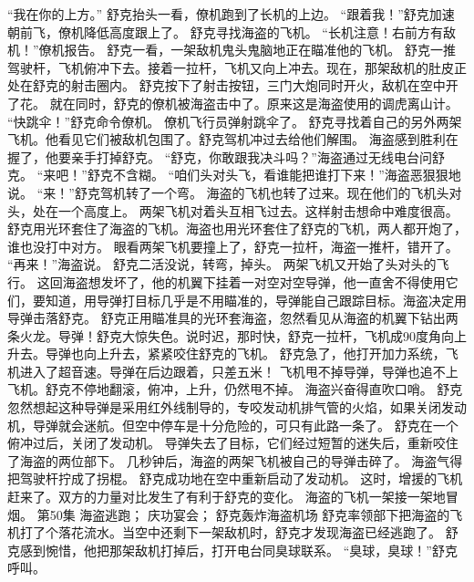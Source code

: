 \documentclass[a4paper,12pt,UTF8,twoside]{ctexbook}
\begin{document}
        “我在你的上方。” 
        舒克抬头一看，僚机跑到了长机的上边。 
        “跟着我！”舒克加速朝前飞，僚机降低高度跟上了。 
        舒克寻找海盗的飞机。 
        “长机注意！右前方有敌机！”僚机报告。 
        舒克一看，一架敌机鬼头鬼脑地正在瞄准他的飞机。 
        舒克一推驾驶杆，飞机俯冲下去。接着一拉杆，飞机又向上冲去。现在，那架敌机的肚皮正处在舒克的射击圈内。 
        舒克按下了射击按钮，三门大炮同时开火，敌机在空中开了花。 
        就在同时，舒克的僚机被海盗击中了。原来这是海盗使用的调虎离山计。 
        “快跳伞！”舒克命令僚机。 
        僚机飞行员弹射跳伞了。 
        舒克寻找着自己的另外两架飞机。他看见它们被敌机包围了。舒克驾机冲过去给他们解围。 
        海盗感到胜利在握了，他要亲手打掉舒克。 
        “舒克，你敢跟我决斗吗？”海盗通过无线电台问舒克。 
        “来吧！”舒克不含糊。 
        “咱们头对头飞，看谁能把谁打下来！”海盗恶狠狠地说。 
        “来！”舒克驾机转了一个弯。 
        海盗的飞机也转了过来。现在他们的飞机头对头，处在一个高度上。 
        两架飞机对着头互相飞过去。这样射击想命中难度很高。舒克用光环套住了海盗的飞机。海盗也用光环套住了舒克的飞机，两人都开炮了，谁也没打中对方。 
        眼看两架飞机要撞上了，舒克一拉杆，海盗一推杆，错开了。 
        “再来！”海盗说。 
        舒克二活没说，转弯，掉头。 
        两架飞机又开始了头对头的飞行。 
        这回海盗想发坏了，他的机翼下挂着一对空对空导弹，他一直舍不得使用它们，要知道，用导弹打目标几乎是不用瞄准的，导弹能自己跟踪目标。海盗决定用导弹击落舒克。 
        舒克正用瞄准具的光环套海盗，忽然看见从海盗的机翼下钻出两条火龙。导弹！舒克大惊失色。说时迟，那时快，舒克一拉杆，飞机成90度角向上升去。导弹也向上升去，紧紧咬住舒克的飞机。 
        舒克急了，他打开加力系统，飞机进入了超音速。导弹在后边跟着，只差五米！ 
        飞机甩不掉导弹，导弹也追不上飞机。舒克不停地翻滚，俯冲，上升，仍然甩不掉。 
        海盗兴奋得直吹口哨。 
        舒克忽然想起这种导弹是采用红外线制导的，专咬发动机排气管的火焰，如果关闭发动机，导弹就会迷航。但空中停车是十分危险的，可只有此路一条了。 
        舒克在一个俯冲过后，关闭了发动机。 
        导弹失去了目标，它们经过短暂的迷失后，重新咬住了海盗的两位部下。 
        几秒钟后，海盗的两架飞机被自己的导弹击碎了。 
        海盗气得把驾驶杆拧成了拐棍。 
        舒克成功地在空中重新启动了发动机。 
        这时，增援的飞机赶来了。双方的力量对比发生了有利于舒克的变化。 
        海盗的飞机一架接一架地冒烟。   第50集 
        海盗逃跑； 
        庆功宴会； 
        舒克轰炸海盗机场   
        舒克率领部下把海盗的飞机打了个落花流水。当空中还剩下一架敌机时，舒克才发现海盗已经逃跑了。 
        舒克感到惋惜，他把那架敌机打掉后，打开电台同臭球联系。 
        “臭球，臭球！”舒克呼叫。 
\end{document}
